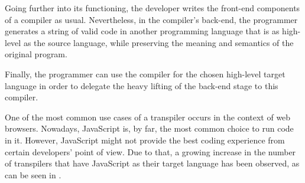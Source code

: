 Going further into its functioning, the developer writes the front-end components of a compiler as usual. Nevertheless, in the compiler's back-end, the programmer generates a string of valid code in another programming language that is as high-level as the source language, while preserving the meaning and semantics of the original program.

Finally, the programmer can use the compiler for the chosen high-level target language in order to delegate the heavy lifting of the back-end stage to this compiler. 

One of the most common use cases of a transpiler occurs in the context of web browsers. Nowadays, JavaScript is, by far, the most common choice to run code in it. However, JavaScript might not provide the best coding experience from certain developers' point of view. Due to that, a growing increase in the number of transpilers that have JavaScript as their target language has been observed, as can be seen in \cite{coffeescriptCompileToJS}.
